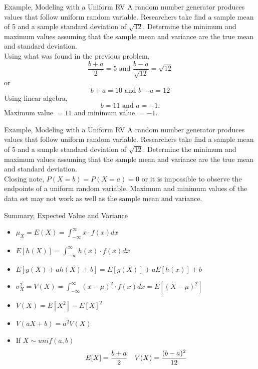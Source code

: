 \documentclass[handout]{beamer}
\newcommand{\nl}[1]{\vspace{#1 em}}
\begin{document}
\begin{frame}{Example, Modeling with a Uniform RV}
    A random number generator produces values that follow uniform random variable. Researchers take find a sample mean of 5 and a sample standard deviation of $\sqrt{12}$. Determine the minimum and maximum values assuming that the sample mean and variance are the true mean and standard deviation. \\ \nl{0.5}
    \pause Using what was found in the previous problem,
    $$ \frac{b+a}{2} = 5 \text{ and } \frac{b-a}{\sqrt{12}} = \sqrt{12}$$
    or
    $$ b+a = 10 \text{ and } b-a = 12$$
    \pause Using linear algebra,
    $$ b =11 \text{ and } a = -1 .$$
    Maximum value $=11$ and minimum value $= -1$.
    \vfill
\end{frame}
\begin{frame}{Example, Modeling with a Uniform RV}
    A random number generator produces values that follow uniform random variable. Researchers take find a sample mean of 5 and a sample standard deviation of $\sqrt{12}$. Determine the minimum and maximum values assuming that the sample mean and variance are the true mean and standard deviation. \\ \nl{1}
    Closing note, $P(X=b)=P(X=a)=0$ or it is impossible to observe the endpoints of a uniform random variable. Maximum and minimum values of the data set may not work as well as the sample mean and variance.
    \vfill
\end{frame}
\begin{frame}{Summary, Expected Value and Variance}
    \begin{itemize}
        \item $\mu_X = E(X) = \int_{-\infty}^\infty x \cdot f(x) dx$
        \item $E[h(X)] = \int_{-\infty}^\infty h(x) \cdot f(x) dx$
        \item $E[g(X) + ah(X) + b] = E[g(X)]+ a E[h(x)] + b$ 
        \item $\sigma^2_X = V(X) = \int_{-\infty}^\infty (x-\mu)^2 \cdot f(x) dx=E[(X-\mu)^2]$
        \item $ V(X) =  E[X^2] - E[X]^2$
        \item $ V(aX +b) = a^2V(X) $
        \item If $X\sim unif(a,b)$
        $$E[X] = \frac{b+a}{2} \hskip 1em V(X) = \frac{(b-a)^2}{12}$$
    \end{itemize}
\end{frame}
\end{document}
